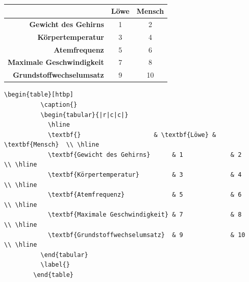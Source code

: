\documentclass["WS\space 16-17\space -\space LaTeX-Kurs\space -\space Praesentation\space -\space 2.tex"]{subfiles}
\begin{document}
\begin{frame}[fragile]
    \vspace{-0.1cm}
    \Losung
	\begin{outputbox}
        \vspace{-0.4cm}
		\begin{center}
            \begin{table}[htbp]
                \caption{}
                \vspace{-0.4cm}
                \begin{tabular}{|r|c|c|}
                    \hline 
                    \textbf{}                         & \textbf{Löwe} & \textbf{Mensch}  \\ \hline 
                    \textbf{Gewicht des Gehirns}      & 1             & 2                \\ \hline 
                    \textbf{Körpertemperatur}         & 3             & 4                \\ \hline 
                    \textbf{Atemfrequenz}             & 5             & 6                \\ \hline 
                    \textbf{Maximale Geschwindigkeit} & 7             & 8                \\ \hline 
                    \textbf{Grundstoffwechselumsatz}  & 9             & 10               \\ \hline
                \end{tabular} 
                \label{}
            \end{table}
		\end{center}
        \vspace{-0.4cm}
	\end{outputbox}
    \vspace{-0.2cm}
    \Code
	\begin{lstlisting}[gobble=8]
        \begin{table}[htbp]
          \caption{}
          \begin{tabular}{|r|c|c|}
            \hline 
            \textbf{}                    & \textbf{Löwe} & \textbf{Mensch}  \\ \hline 
            \textbf{Gewicht des Gehirns}      & 1             & 2           \\ \hline 
            \textbf{Körpertemperatur}         & 3             & 4           \\ \hline 
            \textbf{Atemfrequenz}             & 5             & 6           \\ \hline 
            \textbf{Maximale Geschwindigkeit} & 7             & 8           \\ \hline 
            \textbf{Grundstoffwechselumsatz}  & 9             & 10          \\ \hline
          \end{tabular} 
          \label{}
        \end{table}
	\end{lstlisting}
\end{frame}
\end{document}

